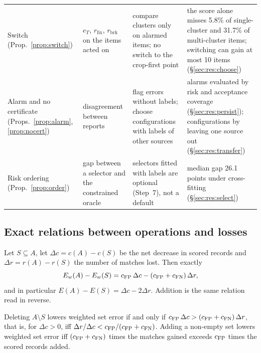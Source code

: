 \begin{table}[t]
\begin{tabular}{@{}>{\raggedright\arraybackslash}p{2.6cm}>{\raggedright\arraybackslash}p{3.2cm}>{\raggedright\arraybackslash}p{4.5cm}>{\raggedright\arraybackslash}p{4.9cm}@{}}
Switch (Prop.~\ref{prop:switch}) & $e_T$, $r_{\mathrm{fix}}$, $r_{\mathrm{brk}}$ on the items acted on & compare clusters only on alarmed items; no switch to the crop-first point & the score alone misses 5.8\% of single-cluster and 31.7\% of multi-cluster items; switching can gain at most 10 items (\S\ref{sec:res:choose}) \\
Alarm and no certificate (Props.~\ref{prop:alarm}, \ref{prop:nocert}) & disagreement between reports & flag errors without labels; choose configurations with labels of other sources & alarms evaluated by risk and acceptance coverage (\S\ref{sec:res:persist}); configurations by leaving one source out (\S\ref{sec:res:transfer}) \\
Risk ordering (Prop.~\ref{prop:order}) & gap between a selector and the constrained oracle & selectors fitted with labels are optional (Step~7), not a default & median gap 26.1 points under cross-fitting (\S\ref{sec:res:select}) \\
\bottomrule
\end{tabular}
\end{table}

\subsection{Exact relations between operations and losses}\label{sec:theory:identities}

\begin{proposition}\label{prop:identity}
Let $S\subseteq A$, let $\Delta c=c(A)-c(S)$ be the net decrease in scored records and $\Delta r=r(A)-r(S)$ the number of matches lost. Then exactly
\[
E_w(A)-E_w(S)=c_{\mathrm{FP}}\,\Delta c-(c_{\mathrm{FP}}+c_{\mathrm{FN}})\,\Delta r,
\]
and in particular $E(A)-E(S)=\Delta c-2\Delta r$. Addition is the same relation read in reverse.
\end{proposition}

\begin{proposition}\label{thm:intersect}
Deleting $A\setminus S$ lowers weighted set error if and only if $c_{\mathrm{FP}}\,\Delta c>(c_{\mathrm{FP}}+c_{\mathrm{FN}})\,\Delta r$, that is, for $\Delta c>0$, iff $\Delta r/\Delta c<c_{\mathrm{FP}}/(c_{\mathrm{FP}}+c_{\mathrm{FN}})$. Adding a non-empty set lowers weighted set error iff $(c_{\mathrm{FP}}+c_{\mathrm{FN}})$ times the matches gained exceeds $c_{\mathrm{FP}}$ times the scored records added.
\end{proposition}

